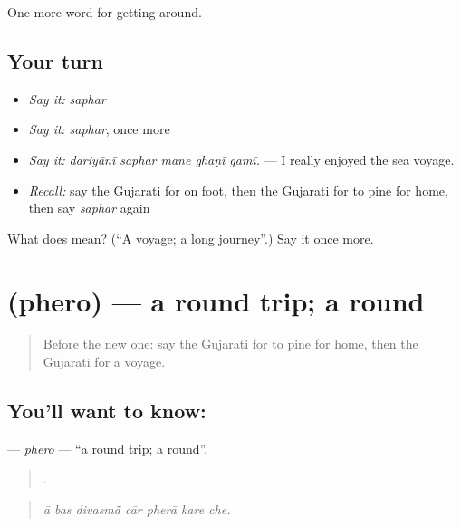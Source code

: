 \begin{grammarlens}[title={What you've built}]
One more word for getting around.
\end{grammarlens}

\subsection*{Your turn}
\begin{itemize}
\raggedright
  \item \emph{Say it:} \emph{saphar}
  \item \emph{Say it:} \emph{saphar}, once more
  \item \emph{Say it:} \emph{dariyānī saphar mane ghaṇī gamī.} — I really enjoyed the sea voyage.
  \item \emph{Recall:} say the Gujarati for on foot, then the Gujarati for to pine for home, then say \emph{saphar} again
\end{itemize}

\begin{tcolorbox}[breakable,colback=teal!4,colframe=teal!35!black,title={Before you move on}]
What does  mean? (\textquotedblleft{}A voyage; a long journey\textquotedblright{}.) Say it once more.
\end{tcolorbox}
\section[\texorpdfstring{\gu{ફેરો} (phero)}{ફેરો (phero)}]{ (phero) — a round trip; a round}

\label{lesson:GU-C408-phero}



\begin{quote}
Before the new one: say the Gujarati for to pine for home, then the Gujarati for a voyage.
\end{quote}

\subsection*{You'll want to know: }
\textbf{} — \emph{phero} — \textquotedblleft{}a round trip; a round\textquotedblright{}.

\begin{quote}
      .
\end{quote}

\begin{quote}
\emph{ā bas divasmā̃ cār pherā kare che.}
\end{quote}

